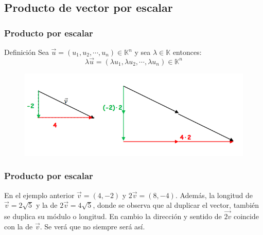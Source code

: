 \documentclass{beamer}
\begin{document}
\subsection{Producto de vector por escalar}

\begin{frame}
  \frametitle{Producto por escalar}
  
  \begin{block}{Definici\'on}
Sea $\vec{u} = (u_1,u_2,\cdots,u_n)\in\mathbb{K}^n$ y sea $\lambda\in\mathbb{K}$ entonces:
\[\lambda\vec{u} =  (\lambda u_1, \lambda u_2,\cdots, \lambda u_n)\in\mathbb{K}^n \]
\end{block}

\begin{figure}[h]
    \label{fig:componentes del producto}
\centering
\includegraphics[width = \textwidth]{components_product}
\end{figure}

\end{frame}

\begin{frame}
  \frametitle{Producto por escalar}
 
 En el ejemplo anterior $\vec{v} = (4,-2)$ y $2\vec{v} = (8,-4)$. Adem\'as, la longitud de $\vec{v} = 2\sqrt{5} $ y la de $2\vec{v} = 4\sqrt{5}$, donde se observa que al duplicar el vector, tambi\'en se duplica su m\'odulo o longitud. En cambio la direcci\'on y sentido de $\vec{2v}$ coincide con la de $\vec{v}$. Se ver\'a que no siempre ser\'a as\'i.
\end{frame}
\end{document}
